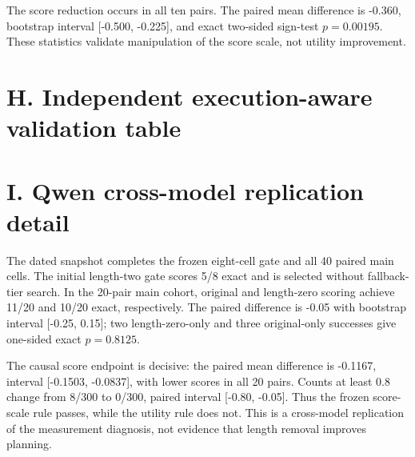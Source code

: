 \documentclass{article}
\begin{document}
The score reduction occurs in all ten pairs. The paired mean difference is -0.360, bootstrap interval [-0.500, -0.225], and exact two-sided sign-test \(p=0.00195\). These statistics validate manipulation of the score scale, not utility improvement.

\section{H. Independent execution-aware validation table}

\begin{center}
\end{center}

\section{I. Qwen cross-model replication detail}

The dated \texttt{} snapshot completes the frozen eight-cell gate and all 40 paired main cells. The initial length-two gate scores 5/8 exact and is selected without fallback-tier search. In the 20-pair main cohort, original and length-zero scoring achieve 11/20 and 10/20 exact, respectively. The paired difference is -0.05 with bootstrap interval [-0.25, 0.15]; two length-zero-only and three original-only successes give one-sided exact \(p=0.8125\).

The causal score endpoint is decisive: the paired mean difference is -0.1167, interval [-0.1503, -0.0837], with lower scores in all 20 pairs. Counts at least 0.8 change from 8/300 to 0/300, paired interval [-0.80, -0.05]. Thus the frozen score-scale rule passes, while the utility rule does not. This is a cross-model replication of the measurement diagnosis, not evidence that length removal improves planning.
\end{document}

